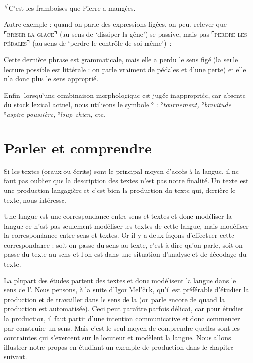 \ea
\textsuperscript{\#}{C’est les framboises que Pierre a mangées}.
\z

Autre exemple : quand on parle des expressions figées, on peut relever que ⌜\textsc{briser} \textsc{la} \textsc{glace}⌝ (au sens de ‘dissiper la gêne’) se passive, mais pas ⌜\textsc{perdre} \textsc{les} \textsc{pédales}⌝ (au sens de ‘perdre le contrôle de soi-même’)~:

\z

\z

\z

\z

Cette dernière phrase est grammaticale, mais elle a perdu le sens figé (la seule lecture possible est littérale : on parle vraiment de pédales et d’une perte) et elle n’a donc plus le sens approprié.

Enfin, lorsqu’une combinaison morphologique est jugée inappropriée, car absente du stock lexical actuel, nous utilisons le symbole ° : °\textit{tournement,} °\textit{bravitude}, °\textit{aspire-poussière}, °\textit{loup-chien}, etc.

\section{Parler et comprendre}\label{sec:1.1.12}

Si les textes (oraux ou écrits) sont le principal moyen d’accès à la langue, il ne faut pas oublier que la description des textes n’est pas notre finalité. Un texte est une production langagière et c’est bien la production du texte qui, derrière le texte, nous intéresse.

Une langue est une correspondance entre sens et textes et donc modéliser la langue ce n’est pas seulement modéliser les textes de cette langue, mais modéliser la correspondance entre sens et textes. Or il y a deux façons d’effectuer cette correspondance : soit on passe du sens au texte, c’est-à-dire qu’on parle, soit on passe du texte au sens et l’on est dans une situation d’analyse et de décodage du texte.

La plupart des études partent des textes et donc modélisent la langue dans le sens de l’. Nous pensons, à la suite d’Igor Mel’čuk, qu’il est préférable d’étudier la production et de travailler dans le sens de la  (on parle encore de  quand la production est automatisée). Ceci peut paraître parfois délicat, car pour étudier la production, il faut partir d’une intention communicative et donc commencer par construire un sens. Mais c’est le seul moyen de comprendre quelles sont les contraintes qui s’exercent sur le locuteur et modèlent la langue. Nous allons illustrer notre propos en étudiant un exemple de production dans le chapitre suivant.

